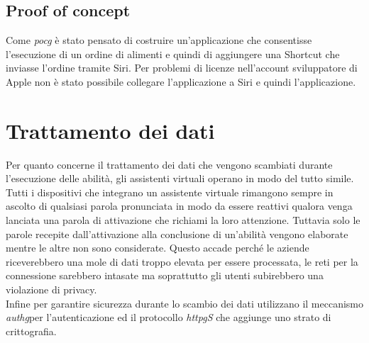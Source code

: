 	\subsection{Proof of concept}
	Come \emph{\gls{pocg}} è stato pensato di costruire un'applicazione che consentisse l'esecuzione di un ordine di alimenti e quindi di aggiungere una Shortcut che inviasse l'ordine tramite Siri. Per problemi di licenze nell'account sviluppatore di Apple non è stato possibile collegare l'applicazione a Siri e quindi l'applicazione.

\section{Trattamento dei dati}
Per quanto concerne il trattamento dei dati che vengono scambiati durante l'esecuzione delle abilità, gli assistenti virtuali operano in modo del tutto simile. \\
Tutti i dispositivi che integrano un assistente virtuale rimangono sempre in ascolto di qualsiasi parola pronunciata in modo da essere reattivi qualora venga lanciata una parola di attivazione che richiami la loro attenzione. Tuttavia solo le parole recepite dall'attivazione alla conclusione di un'abilità vengono elaborate mentre le altre non sono considerate. Questo accade perché le aziende riceverebbero una mole di dati troppo elevata per essere processata, le reti per la connessione sarebbero intasate ma soprattutto gli utenti subirebbero una violazione di privacy. \\
Infine per garantire sicurezza durante lo scambio dei dati utilizzano il meccanismo \emph{\gls{authg}}\glsfirstoccur per l'autenticazione ed il protocollo \emph{\gls{httpg}S} che aggiunge uno strato di crittografia.
